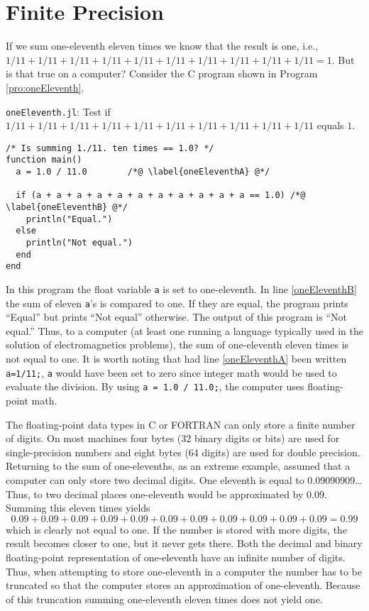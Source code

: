 \section{Finite Precision}

If we sum one-eleventh eleven times we know that the result is one,
i.e., $1/11+1/11+1/11+1/11+1/11+1/11+1/11+1/11+1/11+1/11=1$.  But is
that true on a computer?  Consider the C program shown in Program
\ref{pro:oneEleventh}.
\begin{program}
{\tt oneEleventh.jl}: 
Test if $1/11+1/11+1/11+1/11+1/11+1/11+1/11+1/11+1/11+1/11$ equals $1$. \label{pro:oneEleventh}
\codemiddle
\begin{lstlisting}
/* Is summing 1./11. ten times == 1.0? */
function main()
  a = 1.0 / 11.0        /*@ \label{oneEleventhA} @*/

  if (a + a + a + a + a + a + a + a + a + a + a == 1.0) /*@ \label{oneEleventhB} @*/
    println("Equal.")
  else
    println("Not equal.")
  end
end
\end{lstlisting}
\end{program}
In this program the float variable {\tt a} is set to one-eleventh.  In
line \ref{oneEleventhB} the sum of eleven {\tt a}'s is compared to one.
If they are equal, the program prints ``Equal'' but prints ``Not
equal'' otherwise.  The output of this program is ``Not equal.''
Thus, to a computer (at least one running a language typically used in
the solution of electromagnetics problems),
the sum of one-eleventh eleven times is not equal to
one.  It is worth noting that had line \ref{oneEleventhA} been written
{\tt a=1/11;}, {\tt a} would have been set to zero since integer math
would be used to evaluate the division.  By using {\tt a = 1.0 /
  11.0;}, the computer uses floating-point math.

The floating-point data types in C or FORTRAN can only store a finite
number of digits.  On most machines four bytes (32 binary digits or
bits) are used for single-precision numbers and eight bytes (64
digits) are used for double precision.  Returning to the sum of
one-elevenths, as an extreme example, assumed that a computer can only
store two decimal digits.  One eleventh is equal to 0.09090909\ldots
Thus, to two decimal places one-eleventh would be approximated by
0.09.  Summing this eleven times yields
\[
0.09 + 0.09 + 0.09 + 0.09 + 0.09 + 0.09 + 0.09 + 0.09 + 0.09 + 0.09 +
0.09 = 0.99
\]
which is clearly not equal to one.  If the number is stored with more
digits, the result becomes closer to one, but it never gets there.
Both the decimal and binary floating-point representation of
one-eleventh have an infinite number of digits.  Thus, when attempting
to store one-eleventh in a computer the number has to be truncated so
that the computer stores an approximation of one-eleventh.  Because of
this truncation summing one-eleventh eleven times does not yield one.

